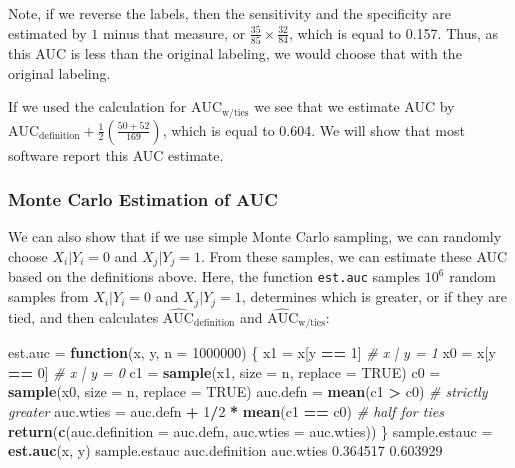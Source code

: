 \documentclass[smallextended]{svjour3}       %
\newenvironment{Shaded}{\begin{snugshade}}{\end{snugshade}}
\newcommand{\CommentTok}[1]{\textcolor[rgb]{0.56,0.35,0.01}{\textit{#1}}}
\newcommand{\ControlFlowTok}[1]{\textcolor[rgb]{0.13,0.29,0.53}{\textbf{#1}}}
\newcommand{\DataTypeTok}[1]{\textcolor[rgb]{0.13,0.29,0.53}{#1}}
\newcommand{\DecValTok}[1]{\textcolor[rgb]{0.00,0.00,0.81}{#1}}
\newcommand{\FloatTok}[1]{\textcolor[rgb]{0.00,0.00,0.81}{#1}}
\newcommand{\KeywordTok}[1]{\textcolor[rgb]{0.13,0.29,0.53}{\textbf{#1}}}
\newcommand{\NormalTok}[1]{#1}
\newcommand{\OperatorTok}[1]{\textcolor[rgb]{0.81,0.36,0.00}{\textbf{#1}}}
\newcommand{\OtherTok}[1]{\textcolor[rgb]{0.56,0.35,0.01}{#1}}
\newcommand{\StringTok}[1]{\textcolor[rgb]{0.31,0.60,0.02}{#1}}
\begin{document}
Note, if we reverse the labels, then the sensitivity and the specificity
are estimated by \(1\) minus that measure, or
\(\frac{35}{85} \times \frac{32}{84}\), which is equal to 0.157. Thus,
as this AUC is less than the original labeling, we would choose that
with the original labeling.

If we used the calculation for \(\text{AUC}_{\text{w/ties}}\) we see
that we estimate AUC by
\(\text{AUC}_{\text{definition}} + \frac{1}{2}\left( \frac{50 + 52}{169}\right)\),
which is equal to 0.604. We will show that most software report this AUC
estimate.

\hypertarget{monte-carlo-estimation-of-auc}{%
\subsubsection{Monte Carlo Estimation of
AUC}\label{monte-carlo-estimation-of-auc}}

We can also show that if we use simple Monte Carlo sampling, we can
randomly choose \(X_{i} | Y_{i} = 0\) and \(X_{j} | Y_{j} = 1\). From
these samples, we can estimate these AUC based on the definitions above.
Here, the function \texttt{est.auc} samples \(\ensuremath{10^{6}}\)
random samples from \(X_{i} | Y_{i} = 0\) and \(X_{j} | Y_{j} = 1\),
determines which is greater, or if they are tied, and then calculates
\(\widehat{\text{AUC}}_{\text{definition}}\) and
\(\widehat{\text{AUC}}_{\text{w/ties}}\):

\begin{Shaded}
\begin{Highlighting}[]
\NormalTok{est.auc =}\StringTok{ }\ControlFlowTok{function}\NormalTok{(x, y, }\DataTypeTok{n =} \DecValTok{1000000}\NormalTok{) \{}
\NormalTok{  x1 =}\StringTok{ }\NormalTok{x[y }\OperatorTok{==}\StringTok{ }\DecValTok{1}\NormalTok{] }\CommentTok{# x | y = 1}
\NormalTok{  x0 =}\StringTok{ }\NormalTok{x[y }\OperatorTok{==}\StringTok{ }\DecValTok{0}\NormalTok{] }\CommentTok{# x | y = 0}
\NormalTok{  c1 =}\StringTok{ }\KeywordTok{sample}\NormalTok{(x1, }\DataTypeTok{size =}\NormalTok{ n, }\DataTypeTok{replace =} \OtherTok{TRUE}\NormalTok{)}
\NormalTok{  c0 =}\StringTok{ }\KeywordTok{sample}\NormalTok{(x0, }\DataTypeTok{size =}\NormalTok{ n, }\DataTypeTok{replace =} \OtherTok{TRUE}\NormalTok{)}
\NormalTok{  auc.defn =}\StringTok{ }\KeywordTok{mean}\NormalTok{(c1 }\OperatorTok{>}\StringTok{ }\NormalTok{c0) }\CommentTok{# strictly greater}
\NormalTok{  auc.wties =}\StringTok{ }\NormalTok{auc.defn }\OperatorTok{+}\StringTok{ }\DecValTok{1}\OperatorTok{/}\DecValTok{2} \OperatorTok{*}\StringTok{ }\KeywordTok{mean}\NormalTok{(c1 }\OperatorTok{==}\StringTok{ }\NormalTok{c0) }\CommentTok{# half for ties}
  \KeywordTok{return}\NormalTok{(}\KeywordTok{c}\NormalTok{(}\DataTypeTok{auc.definition =}\NormalTok{ auc.defn,}
           \DataTypeTok{auc.wties =}\NormalTok{ auc.wties))}
\NormalTok{\}}
\NormalTok{sample.estauc =}\StringTok{ }\KeywordTok{est.auc}\NormalTok{(x, y)}
\NormalTok{sample.estauc}
\NormalTok{auc.definition      auc.wties }
      \FloatTok{0.364517}       \FloatTok{0.603929} 
\end{Highlighting}
\end{Shaded}
\end{document}
